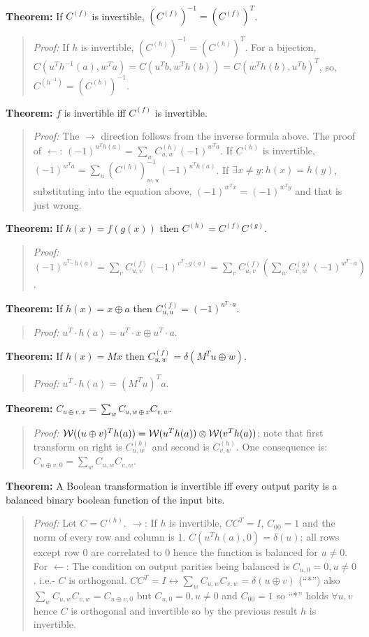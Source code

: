 \\
{\bf Theorem: } If 
$C^{(f)}$ is invertible, $(C^{(f)})^{-1}= (C^{(f)})^{T}$.
\begin{quote}
\emph{Proof: }
If $h$ is invertible, $(C^{(h)})^{-1}= (C^{(h)})^T$.  For a bijection,
$C(u^T h^{-1}(a), w^Ta)= C(u^T b, w^T h(b))= C(w^T h(b), u^T b)^T$,
so, $C^{(h^{-1})}= (C^{(h)})^{-1}$.
\end{quote}
{\bf Theorem: }
$f$ is invertible iff $C^{(f)}$ is invertible.
\begin{quote}
\emph{Proof: }
The $\rightarrow$ direction follows from the inverse formula above.
The proof of $\leftarrow$: $(-1)^{u^T h(a)} = \sum_w C^{(h)}_{u,w} (-1)^{w^T a}$. 
If $C^{(h)}$ is invertible,
$(-1)^{w^T a} = \sum_u (C^{(h)})^{-1}_{w,u} (-1)^{u^T h(a)}$.  
If $\exists x \ne y: h(x) = h(y)$, substituting into
the equation above, $(-1)^{w^Tx}=(-1)^{w^Ty}$ and that is just wrong.
\end{quote}
{\bf Theorem: }
If $h(x)= f(g(x))$ then  $ C^{(h)}= C^{(f)} C^{(g)} $.
\begin{quote}
\emph{Proof: }
$(-1)^{u^T \cdot h(a)} =
\sum_v C^{(f)}_{u,v} (-1)^{v^T \cdot g(a)}=
\sum_v C^{(f)}_{u,v} ( \sum_w C^{(g)}_{v,w} (-1)^{w^T \cdot a})$.
\end{quote}
{\bf Theorem: }
If $h(x)= x \oplus a$ then $C^{(f)}_{u,u} = (-1)^{u^T \cdot a}$.
\begin{quote}
\emph{Proof: }
$u^T \cdot h(a)= u^T \cdot x \oplus u^T \cdot a$.
\end{quote}
{\bf Theorem: }
If $h(x)= Mx$ then $C^{(f)}_{u,w} = \delta(M^Tu \oplus w)$.
\begin{quote}
\emph{Proof:}
$u^T \cdot h(a)= (M^T u)^T a$.
\end{quote}
{\bf Theorem:}
$C_{u \oplus v, x} = \sum_w 
C_{u , w \oplus x} 
C_{v , w} $.
\begin{quote}
\emph{Proof:}
${\cal W}((u \oplus v)^T h(a)) = {\cal W}(u^T h(a)) \otimes {\cal W}(v^T h(a))$;
note that first transform on right is 
$C^{(h)}_{u,w}$ and second is
$C^{(h)}_{v,w}$.  One consequence is: $C_{u \oplus v, 0} = \sum_w C_{u,w} C_{v,w}$.
\end{quote}
{\bf Theorem:}  A Boolean transformation is invertible iff every output parity is
a balanced binary boolean function of the input bits. 
\begin{quote}
\emph{Proof:}  Let $C=C^{(h)}$.
$\rightarrow$: If $h$ is invertible, $C C^T = I$, $C_{00}=1$ and the norm of every
row and column is $1$.  $C(u^T h(a),0) = \delta(u)$; all rows except row $0$ are
correlated to $0$ hence the function is balanced for $u \ne 0$.
For $\leftarrow$: The condition on
output parities being balanced is $C_{u,0}=0, u \ne 0$. i.e.- $C$ is orthogonal.
$C C^T =I \leftrightarrow \sum_w C_{u,w} C_{v,w}= \delta(u \oplus v)$ (``*'') also
$\sum_w C_{u,w} C_{v,w} = C_{u \oplus v,0}$ but $C_{u,0}=0, u \ne 0$ and $C_{00}=1$
so ``*'' holds $\forall u,v$ hence $C$ is orthogonal and invertible so by the previous
result $h$ is invertible.  
\end{quote}
